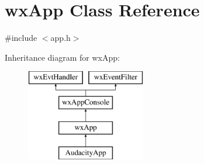 \hypertarget{classwx_app}{}\section{wx\+App Class Reference}
\label{classwx_app}


{\ttfamily \#include $<$app.\+h$>$}

Inheritance diagram for wx\+App\+:\begin{figure}[H]
\begin{center}
\leavevmode
\includegraphics[height=4.000000cm]{classwx_app}
\end{center}
\end{figure}

